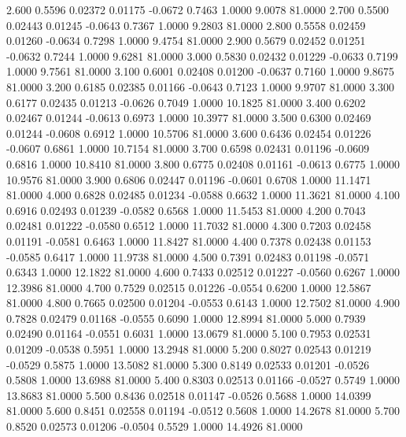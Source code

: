    2.600   0.5596   0.02372   0.01175  -0.0672   0.7463   1.0000   9.0078  81.0000
   2.700   0.5500   0.02443   0.01245  -0.0643   0.7367   1.0000   9.2803  81.0000
   2.800   0.5558   0.02459   0.01260  -0.0634   0.7298   1.0000   9.4754  81.0000
   2.900   0.5679   0.02452   0.01251  -0.0632   0.7244   1.0000   9.6281  81.0000
   3.000   0.5830   0.02432   0.01229  -0.0633   0.7199   1.0000   9.7561  81.0000
   3.100   0.6001   0.02408   0.01200  -0.0637   0.7160   1.0000   9.8675  81.0000
   3.200   0.6185   0.02385   0.01166  -0.0643   0.7123   1.0000   9.9707  81.0000
   3.300   0.6177   0.02435   0.01213  -0.0626   0.7049   1.0000  10.1825  81.0000
   3.400   0.6202   0.02467   0.01244  -0.0613   0.6973   1.0000  10.3977  81.0000
   3.500   0.6300   0.02469   0.01244  -0.0608   0.6912   1.0000  10.5706  81.0000
   3.600   0.6436   0.02454   0.01226  -0.0607   0.6861   1.0000  10.7154  81.0000
   3.700   0.6598   0.02431   0.01196  -0.0609   0.6816   1.0000  10.8410  81.0000
   3.800   0.6775   0.02408   0.01161  -0.0613   0.6775   1.0000  10.9576  81.0000
   3.900   0.6806   0.02447   0.01196  -0.0601   0.6708   1.0000  11.1471  81.0000
   4.000   0.6828   0.02485   0.01234  -0.0588   0.6632   1.0000  11.3621  81.0000
   4.100   0.6916   0.02493   0.01239  -0.0582   0.6568   1.0000  11.5453  81.0000
   4.200   0.7043   0.02481   0.01222  -0.0580   0.6512   1.0000  11.7032  81.0000
   4.300   0.7203   0.02458   0.01191  -0.0581   0.6463   1.0000  11.8427  81.0000
   4.400   0.7378   0.02438   0.01153  -0.0585   0.6417   1.0000  11.9738  81.0000
   4.500   0.7391   0.02483   0.01198  -0.0571   0.6343   1.0000  12.1822  81.0000
   4.600   0.7433   0.02512   0.01227  -0.0560   0.6267   1.0000  12.3986  81.0000
   4.700   0.7529   0.02515   0.01226  -0.0554   0.6200   1.0000  12.5867  81.0000
   4.800   0.7665   0.02500   0.01204  -0.0553   0.6143   1.0000  12.7502  81.0000
   4.900   0.7828   0.02479   0.01168  -0.0555   0.6090   1.0000  12.8994  81.0000
   5.000   0.7939   0.02490   0.01164  -0.0551   0.6031   1.0000  13.0679  81.0000
   5.100   0.7953   0.02531   0.01209  -0.0538   0.5951   1.0000  13.2948  81.0000
   5.200   0.8027   0.02543   0.01219  -0.0529   0.5875   1.0000  13.5082  81.0000
   5.300   0.8149   0.02533   0.01201  -0.0526   0.5808   1.0000  13.6988  81.0000
   5.400   0.8303   0.02513   0.01166  -0.0527   0.5749   1.0000  13.8683  81.0000
   5.500   0.8436   0.02518   0.01147  -0.0526   0.5688   1.0000  14.0399  81.0000
   5.600   0.8451   0.02558   0.01194  -0.0512   0.5608   1.0000  14.2678  81.0000
   5.700   0.8520   0.02573   0.01206  -0.0504   0.5529   1.0000  14.4926  81.0000
